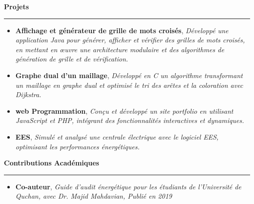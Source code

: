 \documentclass[a4paper]{letter}
\newcommand{\divider}{\rule{\linewidth}{0.9pt}}
\begin{document}
\begin{minipage}[t]{0.60\textwidth}
{\large \textbf{Projets}}
\divider
\vspace{4mm}
\begin{itemize}
    \footnotesize \item {\textbf{Affichage et générateur de grille de mots croisés}, \textit{Développé une application Java pour générer, afficher et vérifier des grilles de mots croisés, en mettant en œuvre une architecture modulaire et des algorithmes de génération de grille et de vérification.}}
    \vspace{2mm}
    \footnotesize \item {\textbf{Graphe dual d’un maillage}, \textit{Développé en C un algorithme transformant un maillage en graphe dual et optimisé le tri des arêtes et la coloration avec Dijkstra.}}
    \vspace{2mm}
    \footnotesize \item {\textbf{web Programmation}, \textit{Conçu et développé un site portfolio en utilisant JavaScript et PHP, intégrant des fonctionnalités interactives et dynamiques.}}
    \vspace{2mm}
    \footnotesize \item {\textbf{EES}, \textit{Simulé et analysé une centrale électrique avec le logiciel EES, optimisant les performances énergétiques.}}


\end{itemize}

\vspace{3mm}


{\large \textbf{Contributions Académiques}}
\divider
\vspace{3mm}
\begin{itemize}
    \footnotesize \item {\textbf{Co-auteur}, \textit{Guide d’audit énergétique pour les étudiants de l’Université de Quchan, avec Dr. Majid Mahdavian, Publié en 2019}}


\end{itemize}


    

\end{minipage}
\end{document}
